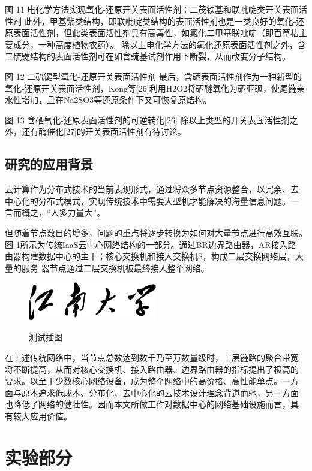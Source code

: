 \documentclass[bachelor,winfonts]{jnuthesis}
\begin{document}
    图 11 电化学方法实现氧化-还原开关表面活性剂：二茂铁基和联吡啶类开关表面活性剂
    此外，甲基紫类结构，即联吡啶类结构的表面活性剂也是一类良好的氧化-还原表面活性剂，但此类表面活性剂具有高毒性，如氯化二甲基联吡啶（即百草枯主要成分，一种高度植物农药）。
    除以上电化学方法的氧化还原表面活性剂之外，含二硫键结构的表面活性剂可在如含巯基试剂作用下断裂，从而改变分子结构。
    
    图 12 二硫键型氧化-还原开关表面活性剂
    最后，含硒表面活性剂作为一种新型的氧化-还原开关表面活性剂，Kong等[26]利用H2O2将硒醚氧化为硒亚砜，使尾链亲水性增加，且在Na2SO3等还原条件下又可恢复原结构。
    
    图 13 含硒氧化-还原表面活性剂的可逆转化[26]
    除以上类型的开关表面活性剂之外，还有酶催化[27]的开关表面活性剂有待讨论。
    

    \section{研究的应用背景}
    云计算作为分布式技术的当前表现形式，通过将众多节点资源整合，以冗余、去
    中心化的分布式模式，实现传统技术中需要大型机才能解决的海量信息问题。一
    言而概之，“人多力量大”。
    
    但随着节点数目的增多，问题的重点将逐步转换为如何对大量节点进行高效互联。图
    \ref{fig:test1}所示为传统IaaS云中心网络结构的一部分。通过BR边界路由器，AR接入路
    由器构建数据中心的主干；核心交换机和接入交换机S，构成二层交换网络层，大量的服务
    器节点通过二层交换机被最终接入整个网络。
    \begin{figure}[htbp]
        \centering
        \includegraphics[width= 0.5\textwidth]{jnuname}\\
        \caption{测试插图}\label{fig:test1}
    \end{figure}
    在上述传统网络中，当节点总数达到数千乃至万数量级时，上层链路的聚合带宽
    将不断提高，从而对核心交换机、接入路由器、边界路由器的指标提出了极高的
    要求。以至于少数核心网络设备，成为整个网络中的高价格、高性能单点。一方
    面与原本追求低成本、分布化、去中心化的云技术设计理念背道而驰，另一方面
    也降低了网络的健壮性。因而本文所做工作对数据中心的网络基础设施而言，具
    有较大应用价值。
    
    \chapter{实验部分}\label{chapter_experiment}
\end{document}
